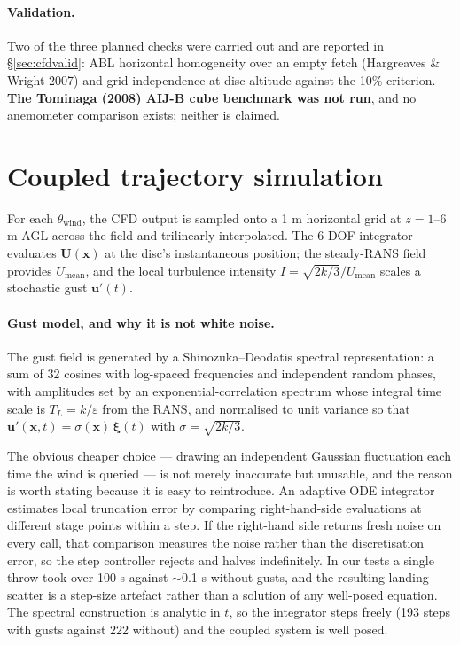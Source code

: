 \documentclass[11pt,letterpaper]{article}
\begin{document}
\paragraph{Validation.} Two of the three planned checks were carried out and
are reported in \S\ref{sec:cfdvalid}: ABL horizontal homogeneity over an empty
fetch (Hargreaves \& Wright 2007) and grid independence at disc altitude
against the 10\% criterion. \textbf{The Tominaga (2008) AIJ-B cube benchmark
was not run}, and no anemometer comparison exists; neither is claimed.

\section{Coupled trajectory simulation}

For each $\theta_{\text{wind}}$, the CFD output is sampled onto a 1 m horizontal
grid at $z = 1$--6 m AGL across the field and trilinearly interpolated. The
6-DOF integrator evaluates $\mathbf{U}(\mathbf{x})$ at the disc's instantaneous
position; the steady-RANS field provides $U_{\text{mean}}$, and the local
turbulence intensity $I = \sqrt{2k/3}/U_{\text{mean}}$ scales a stochastic gust
$\mathbf{u}'(t)$.

\paragraph{Gust model, and why it is not white noise.} The gust field is
generated by a Shinozuka--Deodatis spectral representation: a sum of 32 cosines
with log-spaced frequencies and independent random phases, with amplitudes set
by an exponential-correlation spectrum whose integral time scale is
$T_L = k/\varepsilon$ from the RANS, and normalised to unit variance so that
$\mathbf{u}'(\mathbf{x},t) = \sigma(\mathbf{x})\,\bm{\xi}(t)$ with
$\sigma = \sqrt{2k/3}$.

The obvious cheaper choice --- drawing an independent Gaussian fluctuation each
time the wind is queried --- is not merely inaccurate but unusable, and the
reason is worth stating because it is easy to reintroduce. An adaptive ODE
integrator estimates local truncation error by comparing right-hand-side
evaluations at different stage points within a step. If the right-hand side
returns fresh noise on every call, that comparison measures the noise rather
than the discretisation error, so the step controller rejects and halves
indefinitely. In our tests a single throw took over 100 s against $\sim$0.1 s
without gusts, and the resulting landing scatter is a step-size artefact rather
than a solution of any well-posed equation. The spectral construction is
analytic in $t$, so the integrator steps freely (193 steps with gusts against
222 without) and the coupled system is well posed.
\end{document}
